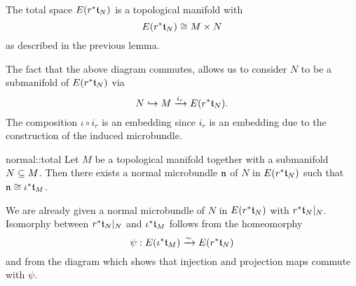 \begin{myparagraph}
    The total space $E(r^*\mathfrak{t}_N)$ is a topological manifold with
    \[ E(r^*\mathfrak{t}_N) \cong M \times N \]
    as described in the previous lemma.

    The fact that the above diagram commutes,
    allows us to consider $N$ to be a submanifold of $E(r^*\mathfrak{t}_N)$ via
    \[ N \hookrightarrow{} M \xrightarrow{i_r} E(r^*\mathfrak{t}_N). \]
    The composition $\iota \circ i_r$ is an embedding since $i_r$ is an embedding
    due to the construction of the induced microbundle.
\end{myparagraph}

\begin{mylemma}{normal::total}{}
    Let $M$ be a topological manifold together with a submanifold $N \subseteq{} M$.
    Then there exists a normal microbundle $\mathfrak{n}$ of $N$ in $E(r^*\mathfrak{t}_N)$ such that $\mathfrak{n} \cong \iota^*\mathfrak{t}_M$.
\end{mylemma}

\begin{myproof}
    We are already given a normal microbundle of $N$ in $E(r^*\mathfrak{t}_N)$ with $r^*\mathfrak{t}_N\vert_{N}$.
    Isomorphy between $r^*\mathfrak{t}_N\vert_{N}$ and $\iota^*\mathfrak{t}_M$ follows from the homeomorphy
    \[ \psi: E(\iota^*\mathfrak{t}_M) \xrightarrow{\sim} E(r^*\mathfrak{t}_N) \]
    and from the diagram which shows that injection and projection maps commute with $\psi$.
\end{myproof}